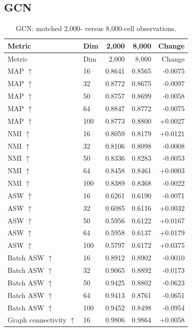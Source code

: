 \documentclass[10pt]{article}
\begin{document}
\subsection{GCN}
\begin{landscape}\begin{longtable}{@{}llrrr@{}}
\caption{GCN: matched 2,000- versus 8,000-cell observations.}\\
\toprule Metric & Dim & 2,000 & 8,000 & Change \\\midrule\endfirsthead
\toprule Metric & Dim & 2,000 & 8,000 & Change \\\midrule\endhead
MAP $\uparrow$ & 16 & 0.8641 & 0.8565 & -0.0075 \\
MAP $\uparrow$ & 32 & 0.8772 & 0.8675 & -0.0097 \\
MAP $\uparrow$ & 50 & 0.8757 & 0.8699 & -0.0058 \\
MAP $\uparrow$ & 64 & 0.8847 & 0.8772 & -0.0075 \\
MAP $\uparrow$ & 100 & 0.8773 & 0.8800 & +0.0027 \\
\addlinespace
NMI $\uparrow$ & 16 & 0.8059 & 0.8179 & +0.0121 \\
NMI $\uparrow$ & 32 & 0.8106 & 0.8098 & -0.0008 \\
NMI $\uparrow$ & 50 & 0.8336 & 0.8283 & -0.0053 \\
NMI $\uparrow$ & 64 & 0.8458 & 0.8461 & +0.0003 \\
NMI $\uparrow$ & 100 & 0.8389 & 0.8368 & -0.0022 \\
\addlinespace
ASW $\uparrow$ & 16 & 0.6261 & 0.6190 & -0.0071 \\
ASW $\uparrow$ & 32 & 0.6085 & 0.6116 & +0.0032 \\
ASW $\uparrow$ & 50 & 0.5956 & 0.6122 & +0.0167 \\
ASW $\uparrow$ & 64 & 0.5958 & 0.6137 & +0.0179 \\
ASW $\uparrow$ & 100 & 0.5797 & 0.6172 & +0.0375 \\
\addlinespace
Batch ASW $\uparrow$ & 16 & 0.8912 & 0.8902 & -0.0010 \\
Batch ASW $\uparrow$ & 32 & 0.9065 & 0.8892 & -0.0173 \\
Batch ASW $\uparrow$ & 50 & 0.9425 & 0.8802 & -0.0623 \\
Batch ASW $\uparrow$ & 64 & 0.9413 & 0.8761 & -0.0651 \\
Batch ASW $\uparrow$ & 100 & 0.9452 & 0.8498 & -0.0954 \\
\addlinespace
Graph connectivity $\uparrow$ & 16 & 0.9806 & 0.9864 & +0.0058 \\

\end{longtable}
\end{landscape}
\end{document}
